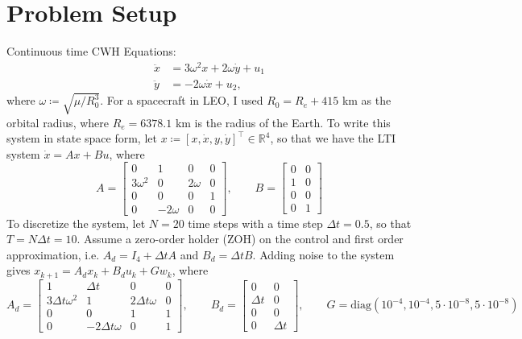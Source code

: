 \documentclass[12pt]{article}
\begin{document}
	
\section*{Problem Setup}
Continuous time CWH Equations:
\begin{align*}
\ddot{x} &= 3\omega^2 x + 2\omega \dot{y} + u_1\\
\ddot{y} &= -2\omega \dot{x} + u_2,
\end{align*}
where $\omega \coloneqq \sqrt{\mu/R_0^3}$. For a spacecraft in LEO, I used $R_0 = R_e + 415$ km as the orbital radius, where $R_e = 6378.1$ km is the radius of the Earth. To write this system in state space form, let $x \coloneqq [x,\dot{x},y,\dot{y}]^\intercal\in\mathbb{R}^4$, so that we have the LTI system $\dot{x} = Ax + Bu$, where 
\begin{equation*}
A = 
\begin{bmatrix}
0 & 1 & 0 & 0\\
3\omega^2 & 0 & 2\omega & 0\\
0 & 0 & 0 & 1\\
0 & -2\omega & 0 & 0
\end{bmatrix}, \qquad
B = 
\begin{bmatrix}
0 & 0\\
1 & 0\\
0 & 0\\
0 & 1
\end{bmatrix}
\end{equation*}
To discretize the system, let $N = 20$ time steps with a time step $\Delta t = 0.5$, so that $T = N\Delta t = 10$. Assume a zero-order holder (ZOH) on the control and first order approximation, i.e. $A_d = I_4 + \Delta t A$ and $B_d = \Delta t B$. Adding noise to the system gives $x_{k+1} = A_d x_{k} + B_d u_k + G w_k$, where 
\begin{equation*}
A_d = 
\begin{bmatrix}
1 & \Delta t & 0 & 0\\
3\Delta t\omega^2 & 1 & 2\Delta t\omega & 0\\
0 & 0 & 1 & 1\\
0 & -2\Delta t\omega & 0 & 1
\end{bmatrix}, \qquad
B_d = 
\begin{bmatrix}
0 & 0\\
\Delta t & 0\\
0 & 0\\
0 & \Delta t
\end{bmatrix}, \qquad 
G = \text{diag}(10^{-4},10^{-4},5\cdot 10^{-8},5\cdot 10^{-8})
\end{equation*}
\end{document}
